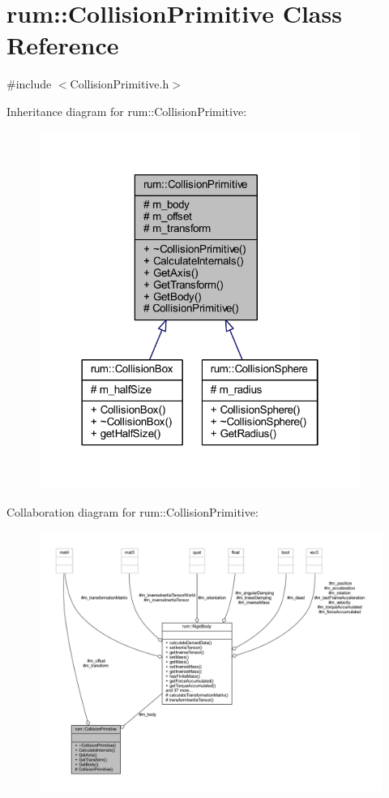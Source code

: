 \hypertarget{classrum_1_1_collision_primitive}{}\section{rum\+:\+:Collision\+Primitive Class Reference}
\label{classrum_1_1_collision_primitive}


{\ttfamily \#include $<$Collision\+Primitive.\+h$>$}



Inheritance diagram for rum\+:\+:Collision\+Primitive\+:\nopagebreak
\begin{figure}[H]
\begin{center}
\leavevmode
\includegraphics[width=298pt]{classrum_1_1_collision_primitive__inherit__graph}
\end{center}
\end{figure}


Collaboration diagram for rum\+:\+:Collision\+Primitive\+:\nopagebreak
\begin{figure}[H]
\begin{center}
\leavevmode
\includegraphics[width=350pt]{classrum_1_1_collision_primitive__coll__graph}
\end{center}
\end{figure}
